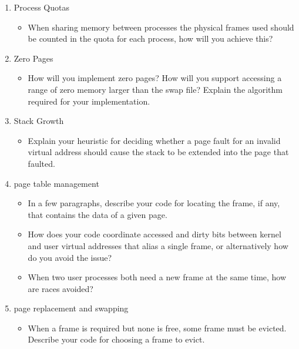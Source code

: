 \begin{enumerate}
    \item Process Quotas
        \begin{itemize}
            \item When sharing memory between processes the physical frames used should be counted in the quota for each process, how will you achieve this?
        \end{itemize}
				
	  \item Zero Pages
        \begin{itemize}
            \item How will you implement zero pages? How will you support accessing a range of zero memory larger than the swap file? Explain the algorithm required for your implementation.
        \end{itemize}			
				
		\item Stack Growth
        \begin{itemize}
            \item Explain your heuristic for deciding whether a page fault for an invalid virtual address should cause the stack to be extended into the page that faulted. 
        \end{itemize}		

    \item page table management
        \begin{itemize}
            \item In a few paragraphs, describe your code for locating the frame, if any, that contains the data of a given page.
            
            \item How does your code coordinate accessed and dirty bits between kernel and user virtual addresses that alias a single frame, or alternatively how do you avoid the issue?
            
            \item When two user processes both need a new frame at the same time, how are races avoided?
        \end{itemize}
    
    \item page replacement and swapping
        \begin{itemize}
            \item When a frame is required but none is free, some frame must be evicted.  Describe your code for choosing a frame to evict.
            

\end{itemize}
\end{enumerate}
